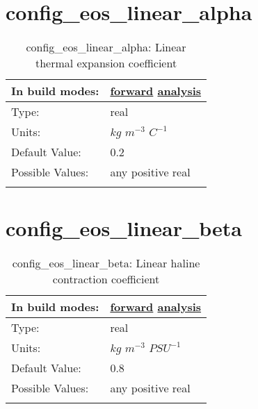 \section[config\_eos\_linear\_alpha]{config\_eos\_linear\_alpha}
\label{sec:nm_sec_config_eos_linear_alpha}
\begin{center}
\begin{longtable}{| p{2.0in} || p{4.0in} |}
    \hline
    In build modes: & \hyperref[subsec:forward_nm_tab_eos_linear]{forward} \hyperref[subsec:analysis_nm_tab_eos_linear]{analysis} \\
    \hline
    Type: & real \\
    \hline
    Units: & $kg$ $m^{-3}$ $C^{-1}$ \\
    \hline
    Default Value: & 0.2 \\
    \hline
    Possible Values: & any positive real \\
    \hline
    \caption{config\_eos\_linear\_alpha: Linear thermal expansion coefficient}
\end{longtable}
\end{center}
\section[config\_eos\_linear\_beta]{config\_eos\_linear\_beta}
\label{sec:nm_sec_config_eos_linear_beta}
\begin{center}
\begin{longtable}{| p{2.0in} || p{4.0in} |}
    \hline
    In build modes: & \hyperref[subsec:forward_nm_tab_eos_linear]{forward} \hyperref[subsec:analysis_nm_tab_eos_linear]{analysis} \\
    \hline
    Type: & real \\
    \hline
    Units: & $kg$ $m^{-3}$ $PSU^{-1}$ \\
    \hline
    Default Value: & 0.8 \\
    \hline
    Possible Values: & any positive real \\
    \hline
    \caption{config\_eos\_linear\_beta: Linear haline contraction coefficient}
\end{longtable}
\end{center}
